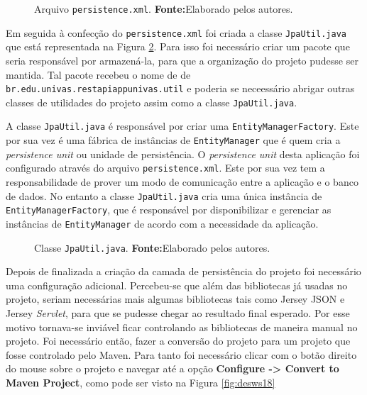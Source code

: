 	\begin{figure}[h!]
		
		\caption[Arquivo persistence.xml]{Arquivo \texttt{persistence.xml}.
		\textbf{Fonte:}Elaborado pelos autores.}
		\label{fig:desws16}
	\end{figure}
	
	\pagebreak
	
	\par Em seguida à confecção do \texttt{persistence.xml} foi criada a
classe \texttt{JpaUtil.java} que está representada na Figura \ref{fig:desws17}.
Para isso foi necessário criar um pacote que seria responsável por armazená-la,
para que a organização do projeto pudesse ser mantida. Tal pacote recebeu o nome de
de \texttt{br.edu.univas.restapiappunivas.util} e poderia se neceessário
abrigar outras classes de utilidades do projeto assim como a classe
\texttt{JpaUtil.java}.
	
	\par A classe \texttt{JpaUtil.java} é responsável por criar uma
\texttt{EntityManagerFactory}. Este por sua vez é uma  fábrica de instâncias de
\texttt{EntityManager} que é quem cria a \textit{persistence unit} ou unidade
de persistência. O \textit{persistence unit} desta aplicação foi configurado
através do arquivo \texttt{persistence.xml}. Este por sua vez tem a
responsabilidade de prover um modo de comunicação entre a aplicação e o banco
de dados. No entanto a classe \texttt{JpaUtil.java} cria uma única instância de
\texttt{EntityManagerFactory}, que é responsável por disponibilizar e gerenciar
as instâncias de \texttt{EntityManager} de acordo com a necessidade da
aplicação.
	
	\begin{figure}[h!]
		
		\caption[Classe JpaUtil.java]{Classe \texttt{JpaUtil.java}.
		\textbf{Fonte:}Elaborado pelos autores.}
		\label{fig:desws17}
	\end{figure}

	\pagebreak
	
	\par Depois de finalizada a criação da camada de persistência do projeto foi
necessário uma configuração adicional. Percebeu-se que além das bibliotecas já
usadas no projeto, seriam necessárias mais algumas bibliotecas tais como Jersey
JSON e Jersey \textit{Servlet}, para que se pudesse chegar ao resultado final
esperado. Por esse motivo tornava-se inviável ficar controlando as bibliotecas
de maneira manual no projeto. Foi necessário então, fazer a conversão do
projeto para um projeto que fosse controlado pelo Maven. Para tanto foi
necessário clicar com o botão direito do mouse sobre o projeto e navegar até a
opção \textbf{Configure -> Convert to Maven Project}, como pode ser visto na
Figura \ref{fig:desws18}

